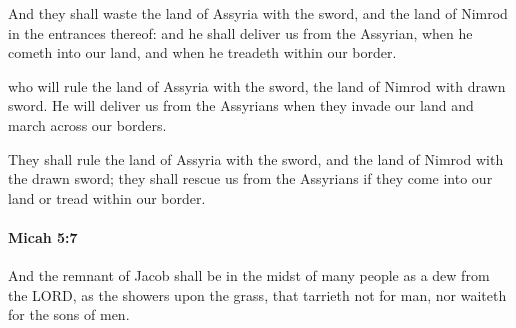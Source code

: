 			\begin{versebox}
					\item[BHS] 
					\item[LXX] 
					\item[ASV] And they shall waste the land of Assyria with the sword, and the land of Nimrod in the entrances thereof: and he shall deliver us from the Assyrian, when he cometh into our land, and when he treadeth within our border.
					\item[NIV] who will rule the land of Assyria with the sword, the land of Nimrod with drawn sword. He will deliver us from the Assyrians when they invade our land and march across our borders.
					\item[NRSV] They shall rule the land of Assyria with the sword, and the land of Nimrod with the drawn sword; they shall rescue us from the Assyrians if they come into our land or tread within our border.
			\end{versebox}

		\paragraph{Micah 5:7} %
			\label{MICAH-5-7}

			And the remnant of Jacob shall be in the midst of many people as a dew from the LORD, as the showers upon the grass, that tarrieth not for man, nor waiteth for the sons of men.


